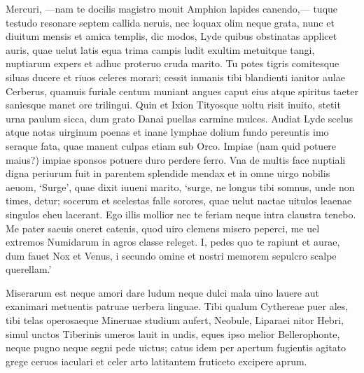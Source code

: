 \documentclass{book}
\newenvironment {carmen} [1] [\relax] 
  {\Titulus \Versus \incipit*\numerus{1}#1}
  {\endVersus}
\newcommand {\Sapphic}   {\Forma \strophae {0 \poena 00 \poena 1}}
\newcommand {\Ionic}     {\Forma \strophae {0 \poena 0 \poena 3}}
\begin{document}
\begin{carmen}[\Sapphic]


Mercuri, ---nam te docilis magistro
 mouit Amphion lapides canendo,---
 tuque testudo resonare septem
      callida neruis, 
nec loquax olim neque grata, nunc et               
 diuitum mensis et amica templis,
 dic modos, Lyde quibus obstinatas
      applicet auris, 
quae uelut latis equa trima campis
 ludit exultim metuitque tangi,               
 nuptiarum expers et adhuc proteruo
      cruda marito. 
Tu potes tigris comitesque siluas
 ducere et riuos celeres morari;
 cessit inmanis tibi blandienti               
      ianitor aulae 
Cerberus, quamuis furiale centum
 muniant angues caput eius atque
 spiritus taeter saniesque manet
      ore trilingui.                
Quin et Ixion Tityosque uoltu
 risit inuito, stetit urna paulum
 sicca, dum grato Danai puellas
      carmine mulces. 
Audiat Lyde scelus atque notas               
 uirginum poenas et inane lymphae
 dolium fundo pereuntis imo
      seraque fata, 
quae manent culpas etiam sub Orco.
 Impiae (nam quid potuere maius?)               
 impiae sponsos potuere duro
      perdere ferro. 
Vna de multis face nuptiali
 digna periurum fuit in parentem
 splendide mendax et in omne uirgo               
      nobilis aeuom, 
`Surge', quae dixit iuueni marito,
`surge, ne longus tibi somnus, unde
 non times, detur; socerum et scelestas
      falle sorores,                
quae uelut nactae uitulos leaenae
 singulos eheu lacerant. Ego illis
 mollior nec te feriam neque intra
      claustra tenebo. 
Me pater saeuis oneret catenis,               
 quod uiro clemens misero peperci,
 me uel extremos Numidarum in agros
      classe releget. 
I, pedes quo te rapiunt et aurae,
 dum fauet Nox et Venus, i secundo               
 omine et nostri memorem sepulcro
      scalpe querellam.' 

\end{carmen}

\begin{carmen}[\Ionic]
Miserarum est neque amori dare ludum neque dulci 
      mala uino lauere aut exanimari
      metuentis patruae uerbera linguae. 
Tibi qualum Cythereae puer ales, tibi telas
      operosaeque Mineruae studium aufert,               
      Neobule, Liparaei nitor Hebri, 
simul unctos Tiberinis umeros lauit in undis, \auto
      eques ipso melior Bellerophonte,
      neque pugno neque segni pede uictus; 
catus idem per apertum fugientis agitato               
      grege ceruos iaculari et celer arto
      latitantem fruticeto excipere aprum. 

\end{carmen}
\end{document}

